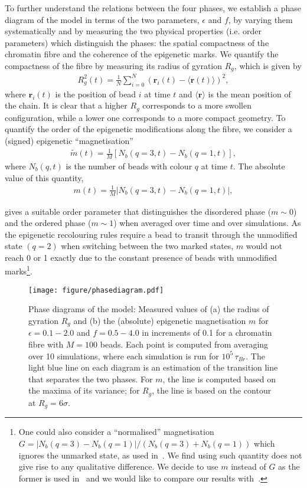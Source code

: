 \documentclass[12pt]{article}
\newcommand*{\DataFig}{/Users/MichaelChiang/Desktop/epigenetics_data/}
\newcommand{\abs}[1]{\left|#1\right|}
\begin{document}
To further understand the relations between the four phases, we establish a phase diagram of the model in terms of the two parameters, $\epsilon$ and  $f$, by varying them systematically and by measuring the two physical properties (i.e. order parameters) which distinguish the phases: the spatial compactness of the chromatin fibre and the coherence of the epigenetic marks. We quantify the compactness of the fibre by measuring its radius of gyration $R_g$, which is given by
\begin{eqnarray}
R^2_g(t) = \frac{1}{N}\sum_{i = 0}^{N} \left(\bm{r}_{i}(t) - \langle \bm{r}(t) \rangle\right)^2,
\end{eqnarray}
\FloatBarrier
where $\bm{r}_i(t)$ is the position of bead $i$ at time $t$ and $\langle\bm{r}\rangle$ is the mean position of the chain. It is clear that a higher $R_g$ corresponds to a more swollen configuration, while a lower one corresponds to a more compact geometry. To quantify the order of the epigenetic modifications along the fibre, we consider a (signed) epigenetic ``magnetisation''
\begin{eqnarray}
\widetilde{m}(t) = \frac{1}{M}\left[N_b(q = 3, t) - N_b(q = 1, t)\right],
\end{eqnarray}
where $N_b(q,t)$ is the number of beads with colour $q$ at time $t$. The absolute value of this quantity,
\begin{eqnarray}
m(t) = \frac{1}{M}\abs{N_b(q = 3, t) - N_b(q = 1, t)},
\end{eqnarray}

gives a suitable order parameter that distinguishes the disordered phase ($m \sim 0$) and the ordered phase ($m \sim 1$) when averaged over time and over simulations. As the epigenetic recolouring rules require a bead to transit through the unmodified state $(q = 2)$ when switching between the two marked states, $m$ would not reach 0 or 1 exactly due to the constant presence of beads with unmodified marks\footnote{One could also consider a ``normalised'' magnetisation $G = \abs{N_b(q = 3) - N_b(q = 1)}/(N_b(q=3)+N_b(q=1))$ which ignores the unmarked state, as used in~\cite{dodd2007}. We find using such quantity does not give rise to any qualitative difference. We decide to use $m$ instead of $G$ as the former is used in~\cite{michieletto2016} and we would like to compare our results with~\cite{michieletto2016}.}.  
\begin{figure}[h]
\centering
\texttt{[image: figure/phasediagram.pdf]}
\caption{Phase diagrams of the model: Measured values of (a) the radius of gyration $R_g$ and (b) the (absolute) epigenetic magnetisation $m$ for $\epsilon = 0.1 - 2.0$ and $f = 0.5 - 4.0$ in increments of 0.1 for a chromatin fibre with $M = 100$ beads. Each point is computed from averaging over 10 simulations, where each simulation is run for $10^5\,\tau_{Br}$. The light blue line on each diagram is an estimation of the transition line that separates the two phases. For $m$, the line is computed based on the maxima of its variance; for $R_g$, the line is based on the contour at $R_g = 6\sigma$.}
\label{fig:phasediagram}
\end{figure}
\end{document}
